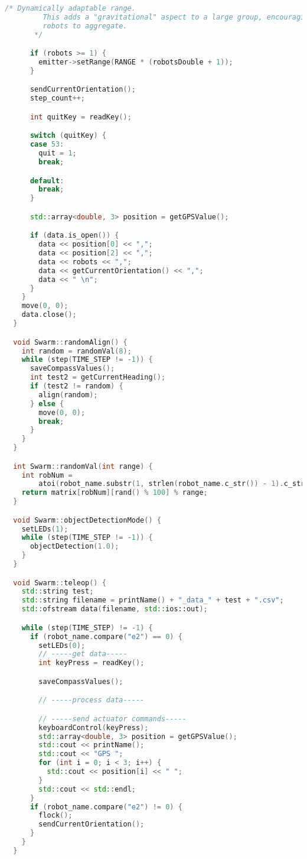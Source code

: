 \begin{lstlisting}[language=C++, caption={swarm.cpp},label={lst:swarm-header}]
      /* Dynamically adaptable range.
         This adds a "gravitational" aspect to a large group, encouraging
         robots to aggregate.
       */

      if (robots >= 1) {
        emitter->setRange(RANGE * (robotsDouble + 1));
      }

      sendCurrentOrientation();
      step_count++;

      int quitKey = readKey();

      switch (quitKey) {
      case 53:
        quit = 1;
        break;

      default:
        break;
      }

      std::array<double, 3> position = getGPSValue();

      if (data.is_open()) {
        data << position[0] << ",";
        data << position[2] << ",";
        data << robots << ",";
        data << getCurrentOrientation() << ",";
        data << " \n";
      }
    }
    move(0, 0);
    data.close();
  }

  void Swarm::randomAlign() {
    int random = randomVal(8);
    while (step(TIME_STEP != -1)) {
      saveCompassValues();
      int test2 = getCurrentHeading();
      if (test2 != random) {
        align(random);
      } else {
        move(0, 0);
        break;
      }
    }
  }

  int Swarm::randomVal(int range) {
    int robNum =
        atoi(robot_name.substr(1, strlen(robot_name.c_str()) - 1).c_str());
    return matrix[robNum][rand() % 100] % range;
  }

  void Swarm::objectDetectionMode() {
    setLEDs(1);
    while (step(TIME_STEP != -1)) {
      objectDetection(1.0);
    }
  }

  void Swarm::teleop() {
    std::string test;
    std::string filename = printName() + "_data_" + test + ".csv";
    std::ofstream data(filename, std::ios::out);

    while (step(TIME_STEP) != -1) {
      if (robot_name.compare("e2") == 0) {
        setLEDs(0);
        // -----get data-----
        int keyPress = readKey();

        saveCompassValues();

        // -----process data-----

        // -----send actuator commands-----
        keyboardControl(keyPress);
        std::array<double, 3> position = getGPSValue();
        std::cout << printName();
        std::cout << "GPS ";
        for (int i = 0; i < 3; i++) {
          std::cout << position[i] << " ";
        }
        std::cout << std::endl;
      }
      if (robot_name.compare("e2") != 0) {
        flock();
        sendCurrentOrientation();
      }
    }
  }


\end{lstlisting}
